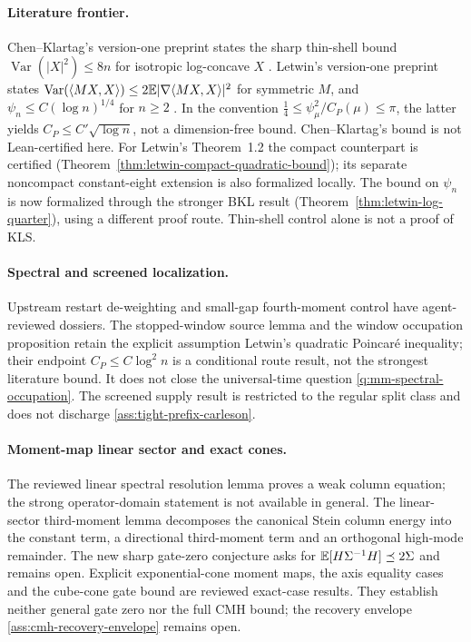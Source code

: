 \paragraph{Literature frontier.}
Chen--Klartag's version-one preprint states the sharp thin-shell bound
$\operatorname{Var}(|X|^2)\le8n$ for isotropic log-concave $X$
\cite{ChenKlartag2026SharpThinShell}. Letwin's version-one preprint states
$\operatorname{Var}(\langle MX,X\rangle)\le2\mathbb{E}|\nabla\langle MX,X\rangle|^2$
for symmetric $M$, and $\psi_n\le C(\log n)^{1/4}$ for $n\ge2$
\cite{Letwin2026QuadraticKLS}. In the convention
$\tfrac14\le\psi_\mu^2/C_P(\mu)\le\pi$, the latter yields
$C_P\le C'\sqrt{\log n}$, not a dimension-free bound. Chen--Klartag's bound is not Lean-certified here. For Letwin's Theorem~1.2 the compact
counterpart is certified (Theorem~\ref{thm:letwin-compact-quadratic-bound}); its separate
noncompact constant-eight extension is also formalized locally. The bound on $\psi_n$ is
now formalized through the stronger BKL result (Theorem~\ref{thm:letwin-log-quarter}),
using a different proof route. Thin-shell control alone is not a proof of KLS.

\paragraph{Spectral and screened localization.}
Upstream restart de-weighting and
small-gap fourth-moment control have agent-reviewed dossiers.
The stopped-window source lemma and the window occupation proposition
retain the explicit assumption Letwin's quadratic Poincar\'e inequality; their endpoint
$C_P\le C\log^2 n$ is a conditional route result, not the strongest literature bound.
It does not close the universal-time question \cref{q:mm-spectral-occupation}.
The screened supply result is restricted to the
regular split class and does not discharge \cref{ass:tight-prefix-carleson}.

\paragraph{Moment-map linear sector and exact cones.}
The reviewed linear spectral resolution lemma proves a weak column equation;
the strong operator-domain statement is not available in general.
The linear-sector third-moment lemma decomposes the canonical Stein column energy
into the constant term, a directional third-moment term and an orthogonal high-mode
remainder. The new sharp gate-zero conjecture asks for
$\mathbb{E}[H\Sigma^{-1}H]\preceq2\Sigma$ and remains open. Explicit exponential-cone
moment maps, the axis equality cases and the cube-cone gate bound are reviewed exact-case
results. They establish neither general gate zero nor the full CMH bound; the recovery
envelope \cref{ass:cmh-recovery-envelope} remains open.

